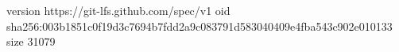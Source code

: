 version https://git-lfs.github.com/spec/v1
oid sha256:003b1851c0f19d3c7694b7fdd2a9c083791d583040409e4fba543c902e010133
size 31079
